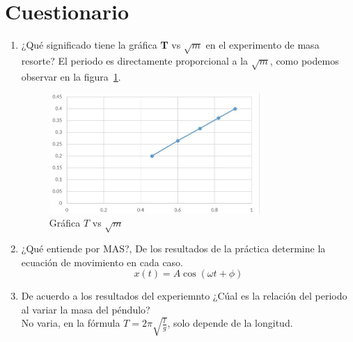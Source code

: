 \section{Cuestionario}
\begin{enumerate}[itemsep=2pt]
	\item ¿Qué significado tiene la gráfica {\bf T} vs {\bf $\sqrt{m}$} en el experimento de masa resorte?
	El periodo es directamente proporcional a la $\sqrt{m}$, como podemos observar en la figura~\ref{Fig:min}.
	\begin{figure}[H]
		\centering
		\includegraphics[width=8cm]{Images/min_iv.jpeg}
		\caption{Gráfica $T$ vs $\sqrt{m}$}\label{Fig:min}
	\end{figure}
	\item ¿Qué entiende por MAS?, De los resultados  de la práctica determine la ecuación de movimiento en cada caso.%
	\[x(t)=A\cos(\omega t+ \phi)\]
	\item De acuerdo  a los resultados del experiemnto ¿Cúal es la relación del periodo al variar la masa del péndulo?\\
	No varia, en la fórmula $T=2\pi \sqrt{\tfrac{l}{g}}$, solo depende de la longitud.
\end{enumerate}

